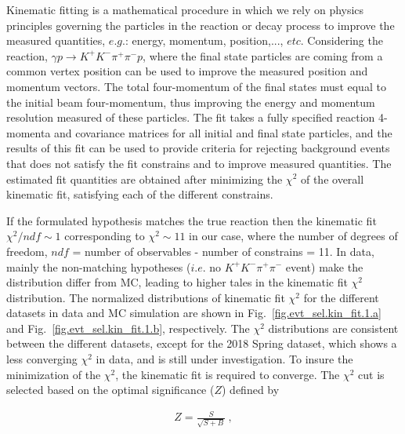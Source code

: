 Kinematic fitting is a mathematical procedure in which we rely on physics principles governing the particles in the reaction or decay process to improve the measured quantities, $e.g.$: energy, momentum, position,..., $etc$. Considering the reaction, $\gamma p \rightarrow K^+ K^- \pi^+ \pi^- p$, where the final state particles are coming from a common vertex position can be used to improve the measured position and momentum vectors. The total four-momentum of the final states must equal to the initial beam four-momentum, thus improving the energy and momentum resolution measured of these particles. The fit takes a fully specified reaction 4-momenta and covariance matrices for all initial and final state particles, and the results of this fit can be used to provide criteria for rejecting background events that does not satisfy the fit constrains and to improve measured quantities. The estimated fit quantities are obtained after minimizing the $\chi^{2}$ of the overall kinematic fit, satisfying each of the different constrains.
~\par If the formulated hypothesis matches the true reaction then the kinematic fit $\chi^{2}/ndf \sim 1$ corresponding to $\chi^{2} \sim 11$ in our case, where the number of degrees of freedom, $ndf$ = number of observables - number of constrains = 11. In data, mainly the non-matching hypotheses ($i.e.$ no $K^{+}K^{-}\pi^{+}\pi^{-}$ event) make the distribution differ from MC, leading to higher tales in the kinematic fit $\chi^{2}$ distribution. The normalized distributions of kinematic fit $\chi^{2}$ for the different datasets in data and MC simulation are shown in Fig.~\ref{fig.evt_sel.kin_fit.1.a} and Fig.~\ref{fig.evt_sel.kin_fit.1.b}, respectively. The $\chi^{2}$ distributions are consistent between the different datasets, except for the 2018 Spring dataset, which shows a less converging $\chi^{2}$ in data, and is still under investigation. To insure the minimization of the $\chi^{2}$, the kinematic fit is required to converge. The $\chi^{2}$ cut is selected based on the optimal significance ($Z$) defined by

\begin{equation}
    \label{eq.evt_sel.kin_fit.2}
    \begin{aligned}
        Z = \frac{S}{\sqrt{S+B}}~,
    \end{aligned}
\end{equation}

